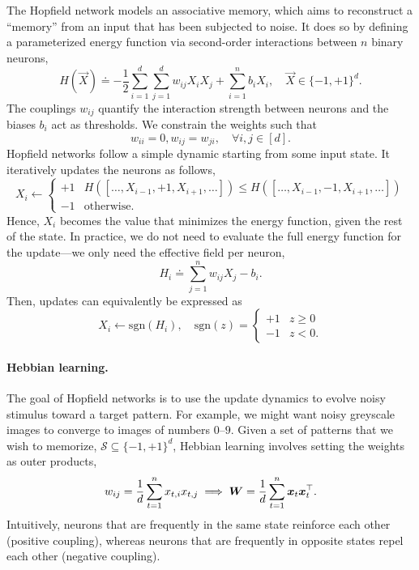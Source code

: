 The Hopfield network \citep{hopfield1982neural} models an associative memory, which aims to
reconstruct a ``memory'' from an input that has been subjected to noise. It does so by defining a
parameterized energy function via second-order interactions between $n$ binary neurons, \[
    H(\vec{X}) \doteq - \frac{1}{2} \sum_{i=1}^{d} \sum_{j=1}^{d} w_{ij} X_i X_j + \sum_{i=1}^{n} b_i X_i, \quad \vec{X} \in \{ -1, +1 \}^d.
\]
The couplings $w_{ij}$ quantify the interaction strength between neurons and the biases $b_i$ act
as thresholds. We constrain the weights such that \[
    w_{ii} = 0, w_{ij} = w_{ji}, \quad \forall i,j \in [d].
\]
Hopfield networks follow a simple dynamic starting from some input state. It iteratively updates
the neurons as follows, \[
    X_i \gets \begin{cases}
        +1 & H([\ldots, X_{i-1}, +1, X_{i+1}, \ldots]) \leq H([\ldots, X_{i-1}, -1, X_{i+1}, \ldots]) \\
        -1 & \text{otherwise}.
    \end{cases}
\]
Hence, $X_i$ becomes the value that minimizes the energy function, given the rest of the state. In
practice, we do not need to evaluate the full energy function for the update---we only need the
effective field per neuron, \[
    H_i \doteq \sum_{j=1}^{n} w_{ij} X_j - b_i.
\]
Then, updates can equivalently be expressed as \[
    X_i \gets \mathrm{sgn}(H_i), \quad \mathrm{sgn}(z) = \begin{cases}
        +1 & z \geq 0 \\
        -1 & z < 0.
    \end{cases}
\]

\paragraph{Hebbian learning.}

The goal of Hopfield networks is to use the update dynamics to evolve noisy stimulus toward a
target pattern. For example, we might want noisy greyscale images to converge to images of numbers
$0$--$9$. Given a set of patterns that we wish to memorize, $\mathcal{S} \subseteq \{ -1, +1 \}^d$,
Hebbian learning involves setting the weights as outer products, \[
    w_{ij} = \frac{1}{d} \sum_{t=1}^{n} x_{t,i} x_{t,j} \implies \bm{W} = \frac{1}{d} \sum_{t=1}^{n} \bm{x}_t \bm{x}_t^\top.
\]
Intuitively, neurons that are frequently in the same state reinforce each other (positive
coupling), whereas neurons that are frequently in opposite states repel each other (negative
coupling).

